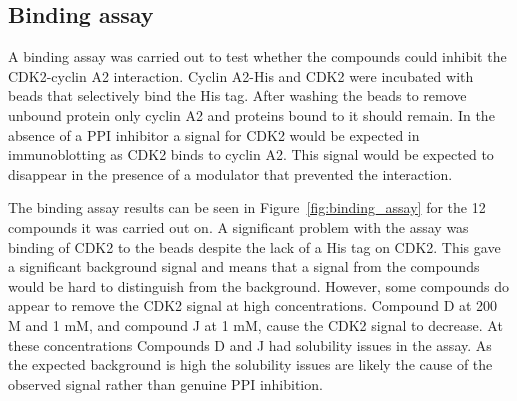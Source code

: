 \begin{figure}


\end{figure}


\subsection{Binding assay}

A binding assay was carried out to test whether the compounds could inhibit the CDK2-cyclin A2 interaction.
Cyclin A2-His and CDK2 were incubated with beads that selectively bind the His tag.
After washing the beads to remove unbound protein only cyclin A2 and proteins bound to it should remain.
In the absence of a PPI inhibitor a signal for CDK2 would be expected in immunoblotting as CDK2 binds to cyclin A2.
This signal would be expected to disappear in the presence of a modulator that prevented the interaction.

The binding assay results can be seen in Figure~\ref{fig:binding_assay} for the 12 compounds it was carried out on.
A significant problem with the assay was binding of CDK2 to the beads despite the lack of a His tag on CDK2.
This gave a significant background signal and means that a signal from the compounds would be hard to distinguish from the background.
However, some compounds do appear to remove the CDK2 signal at high concentrations.
Compound D at 200 \textmu M and 1 mM, and compound J at 1 mM, cause the CDK2 signal to decrease.
At these concentrations Compounds D and J had solubility issues in the assay.
As the expected background is high the solubility issues are likely the cause of the observed signal rather than genuine PPI inhibition.


